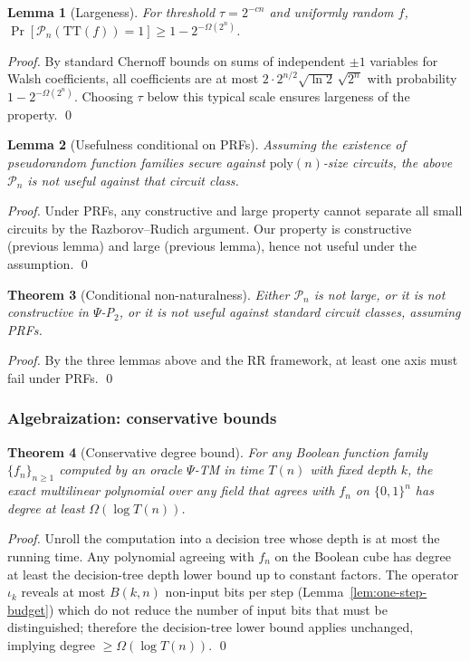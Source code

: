 \documentclass[11pt]{article}
\newtheorem{theorem}{Theorem}[section]
\newtheorem{lemma}[theorem]{Lemma}
\theoremstyle{definition}
\newcommand{\PSi}{\Psi}
\newcommand{\bits}{\{0,1\}}
\begin{document}
\begin{lemma}[Largeness]
For threshold $\tau = 2^{-c n}$ and uniformly random $f$, $\Pr[\mathcal{P}_n(\mathrm{TT}(f))=1]\ge 1-2^{-\Omega(2^n)}$.
\end{lemma}
\begin{proof}
By standard Chernoff bounds on sums of independent $\pm1$ variables for Walsh coefficients, all coefficients are at most $2\cdot 2^{n/2}\sqrt{\ln 2}\,\sqrt{2^n}$ with probability $1-2^{-\Omega(2^n)}$. Choosing $\tau$ below this typical scale ensures largeness of the property. \qed
\end{proof}

\begin{lemma}[Usefulness conditional on PRFs]
Assuming the existence of pseudorandom function families secure against $\mathrm{poly}(n)$-size circuits, the above $\mathcal{P}_n$ is not useful against that circuit class.
\end{lemma}
\begin{proof}
Under PRFs, any constructive and large property cannot separate all small circuits by the Razborov–Rudich argument. Our property is constructive (previous lemma) and large (previous lemma), hence not useful under the assumption. \qed
\end{proof}

\begin{theorem}[Conditional non-naturalness]
Either $\mathcal{P}_n$ is not large, or it is not constructive in $\PSi$-P$_2$, or it is not useful against standard circuit classes, assuming PRFs.
\end{theorem}
\begin{proof}
By the three lemmas above and the RR framework, at least one axis must fail under PRFs. \qed
\end{proof}

\subsubsection{Algebraization: conservative bounds}
\label{sec:algebraization}

\begin{theorem}[Conservative degree bound]
For any Boolean function family $\{f_n\}_{n\ge1}$ computed by an oracle $\PSi$-TM in time $T(n)$ with fixed depth $k$, the exact multilinear polynomial over any field that agrees with $f_n$ on $\bits^n$ has degree at least $\Omega(\log T(n))$.
\end{theorem}
\begin{proof}
Unroll the computation into a decision tree whose depth is at most the running time. Any polynomial agreeing with $f_n$ on the Boolean cube has degree at least the decision-tree depth lower bound up to constant factors. The operator $\iota_k$ reveals at most $B(k,n)$ non-input bits per step (Lemma~\ref{lem:one-step-budget}) which do not reduce the number of input bits that must be distinguished; therefore the decision-tree lower bound applies unchanged, implying degree $\ge \Omega(\log T(n))$. \qed
\end{proof}
\end{document}
